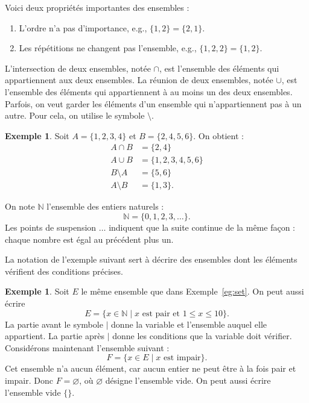\documentclass[12pt,a4paper]{article}
\theoremstyle{plain}
\theoremstyle{definition}
\newtheorem{example}[theorem]{Exemple}
\theoremstyle{remark}
\begin{document}
Voici deux propriétés importantes des ensembles :

\begin{enumerate}
    \renewcommand{\labelenumi}{(\roman{enumi})}
    \item L'ordre n'a pas d'importance, e.g., $\{1,2\}=\{2,1\}$.
    \item Les répétitions ne changent pas l'ensemble, e.g., 
    $\{1,2,2\}=\{1,2\}$.
\end{enumerate}

L'intersection de deux ensembles, notée $\cap$, est l'ensemble des
éléments qui appartiennent aux deux ensembles. La réunion de deux
ensembles, notée $\cup$, est l'ensemble des éléments qui appartiennent
à au moins un des deux ensembles. Parfois, on veut garder les éléments
d'un ensemble qui n'appartiennent pas à un autre. Pour cela, on utilise
le symbole $\setminus$.

\begin{example}
  Soit $A = \{1, 2, 3, 4\}$ et $B = \{2, 4, 5, 6\}$.
  On obtient :
  \[
    \begin{aligned}
        A \cap B &= \{2, 4\} \\
        A \cup B &= \{1, 2, 3, 4, 5, 6\} \\
        B \setminus A &= \{5, 6\} \\
        A \setminus B &= \{1, 3\}.
    \end{aligned}
  \]
\end{example}

On note $\mathbb{N}$ l'ensemble des entiers naturels :
\[
  \mathbb{N} = \{0, 1, 2, 3, \dots\}.
\]
Les points de suspension $\dots$ indiquent que la suite continue de la
même façon : chaque nombre est égal au précédent plus un.

La notation de l'exemple suivant sert à décrire des ensembles dont les
éléments vérifient des conditions précises.

\begin{example}
  Soit $E$ le même ensemble que dans Exemple~\ref{eg:set}. On peut aussi écrire
  \[
    E = \{x \in \mathbb{N} \mid x \text{ est pair et } 1 \le x \le 10\}.
  \]
  La partie avant le symbole $\mid$ donne la variable et l'ensemble
  auquel elle appartient. La partie après $\mid$ donne les conditions
  que la variable doit vérifier. Considérons maintenant l'ensemble
  suivant :
  \[
    F = \{x \in E \mid x \text{ est impair}\}.
  \]
  Cet ensemble n'a aucun élément, car aucun entier ne peut être à la
  fois pair et impair. Donc $F = \varnothing$, où $\varnothing$ désigne
  l'ensemble vide. On peut aussi écrire l'ensemble vide $\{\}$.
\end{example}
\end{document}
